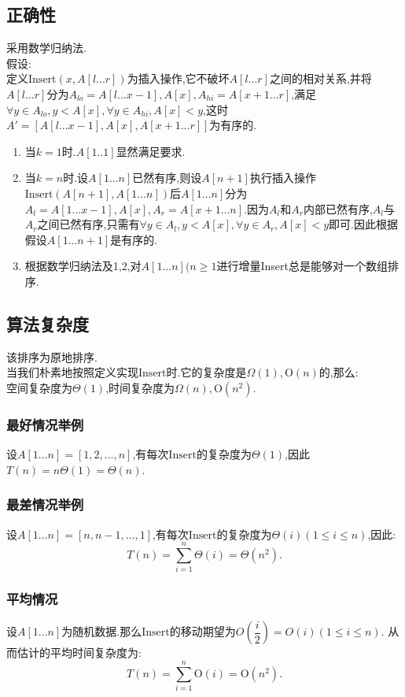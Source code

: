 \documentclass[UTF8]{ctexart}
\newcommand{\gro}{\mathrm{O}}
\begin{document}
\subsection{正确性}
采用数学归纳法.\\
\indent
假设:\\
\indent
定义$\mathrm{Insert}(x,A[l...r])$为插入操作,它不破坏$A[l...r]$之间的相对关系,并将$A[l...r]$分为$A_{lo}=A[l...x-1],A[x],A_{hi}=A[x+1...r]$,满足$\forall y\in A_{lo}, y<A[x], \forall y\in A_{hi}, A[x] < y$,这时$A' = [A[l...x-1], A[x],A[x+1...r]]$为有序的.
\begin{enumerate}[1.]
\item 当$k=1$时.$A[1..1]$显然满足要求.
\item 当$k=n$时.设$A[1...n]$已然有序,则设$A[n+1]$执行插入操作$\mathrm{Insert}(A[n+1],A[1...n])$后$A[1...n]$分为$A_l=A[1...x-1],A[x],A_r=A[x+1...n]$.因为$A_l$和$A_r$内部已然有序,$A_l$与$A_r$之间已然有序,只需有$\forall y\in A_l, y<A[x], \forall y\in A_r, A[x] < y$即可.因此根据假设$A[1...n+1]$是有序的.
\item 根据数学归纳法及1,2,对$A[1...n](n\geqslant 1$进行增量Insert总是能够对一个数组排序.
\end{enumerate}
\subsection{算法复杂度}
该排序为原地排序.\\
\indent
当我们朴素地按照定义实现$\mathrm{Insert}$时.它的复杂度是$\Omega(1),\gro(n)$的,那么:\\
\indent
空间复杂度为$\Theta(1)$,时间复杂度为$\Omega(n),\gro(n^2)$.\\
\subsubsection{最好情况举例}
\indent
设$A[1...n]= [1,2,...,n]$,有每次$\mathrm{Insert}$的复杂度为$\Theta(1)$,因此$T(n)=n\Theta(1)=\Theta(n)$.
\subsubsection{最差情况举例}
\indent
设$A[1...n]= [n,n-1,...,1]$,有每次$\mathrm{Insert}$的复杂度为$\Theta(i)(1\leqslant i \leqslant n)$,因此:$$
    T(n)=\sum_{i=1}^{n}\Theta(i)=\Theta(n^2).
$$
\indent
\subsubsection{平均情况}
\indent
设$A[1...n]$为随机数据.那么$\mathrm{Insert}$的移动期望为$O(\dfrac{i}{2})=O(i)(1\leqslant i \leqslant n)$.
从而估计的平均时间复杂度为:
$$
T(n)=\sum_{i=1}^{n}\gro(i)=\gro(n^2).
$$
\end{document}
